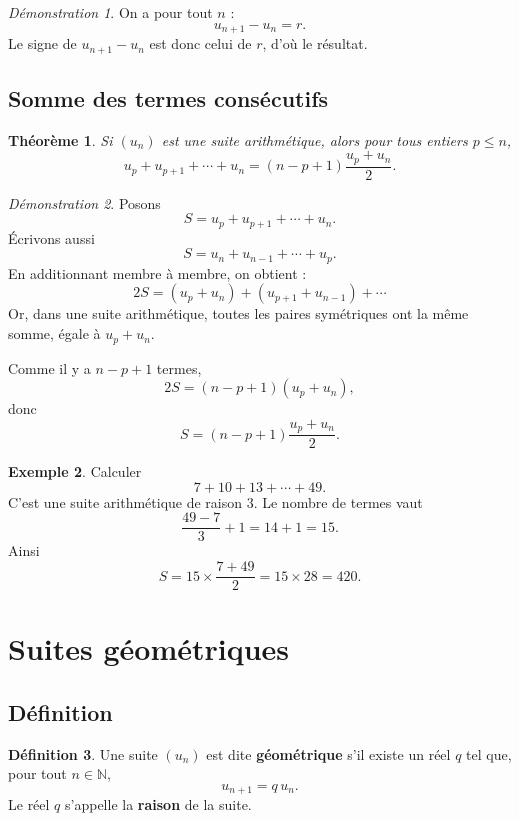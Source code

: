 \documentclass[11pt,a4paper]{article}
\theoremstyle{definition}
\newtheorem{definition}{Définition}[section]
\newtheorem{exemple}[definition]{Exemple}
\theoremstyle{plain}
\newtheorem{theoreme}[definition]{Théorème}
\theoremstyle{remark}
\newtheorem*{demonstrationlibre}{Démonstration}
\newcommand{\N}{\mathbb{N}}
\begin{document}
\begin{demonstrationlibre}
On a pour tout $n$ :
\[
u_{n+1}-u_n=r.
\]
Le signe de $u_{n+1}-u_n$ est donc celui de $r$, d'où le résultat.
\end{demonstrationlibre}

\subsection{Somme des termes consécutifs}

\begin{theoreme}
Si $(u_n)$ est une suite arithmétique, alors pour tous entiers $p\leq n$,
\[
u_p+u_{p+1}+\cdots+u_n=(n-p+1)\frac{u_p+u_n}{2}.
\]
\end{theoreme}

\begin{demonstrationlibre}
Posons
\[
S=u_p+u_{p+1}+\cdots+u_n.
\]
Écrivons aussi
\[
S=u_n+u_{n-1}+\cdots+u_p.
\]
En additionnant membre à membre, on obtient :
\[
2S=(u_p+u_n)+(u_{p+1}+u_{n-1})+\cdots
\]
Or, dans une suite arithmétique, toutes les paires symétriques ont la même somme, égale à $u_p+u_n$.

Comme il y a $n-p+1$ termes,
\[
2S=(n-p+1)(u_p+u_n),
\]
donc
\[
S=(n-p+1)\frac{u_p+u_n}{2}.
\]
\end{demonstrationlibre}

\begin{exemple}
Calculer
\[
7+10+13+\cdots+49.
\]
C'est une suite arithmétique de raison $3$. Le nombre de termes vaut
\[
\frac{49-7}{3}+1=14+1=15.
\]
Ainsi
\[
S=15\times \frac{7+49}{2}=15\times 28=420.
\]
\end{exemple}

\section{Suites géométriques}

\subsection{Définition}

\begin{definition}
Une suite $(u_n)$ est dite \textbf{géométrique} s'il existe un réel $q$ tel que, pour tout $n\in\N$,
\[
u_{n+1}=q\,u_n.
\]
Le réel $q$ s'appelle la \textbf{raison} de la suite.
\end{definition}
\end{document}
